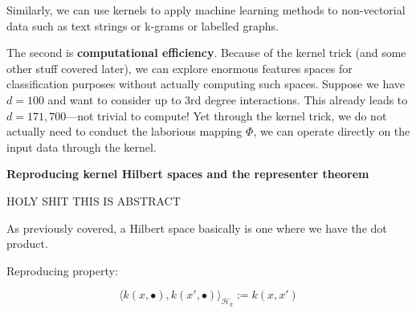 \documentclass{article}
\begin{document}
Similarly, we can use kernels to apply machine learning methods to non-vectorial
data such as text strings or k-grams or labelled graphs.

The second is \textbf{computational efficiency}. Because of the kernel trick
(and some other stuff covered later), we can explore enormous features spaces
for classification purposes without actually computing such spaces. Suppose we
have $d=100$ and want to consider up to 3rd degree interactions. This already
leads to $d=171,700$---not trivial to compute! Yet through the kernel trick, we
do not actually need to conduct the laborious mapping $\Phi$, we can operate
directly on the input data through the kernel. 

\newpage

\textbf{Reproducing kernel Hilbert spaces and the representer theorem}

HOLY SHIT THIS IS ABSTRACT

As previously covered, a Hilbert space basically is one where we have the dot
product. 

Reproducing property:

$$
\langle k(x, \bullet), k(x', \bullet) \rangle_{\mathcal{H}_k} := k(x, x')
$$
\end{document}
